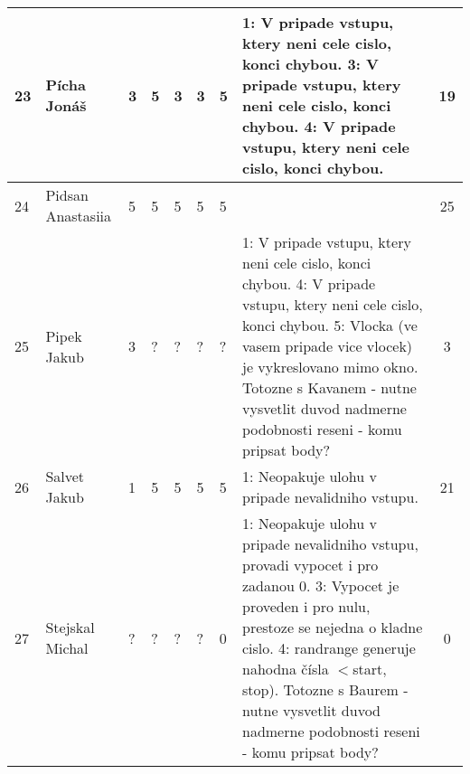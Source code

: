 \documentclass[landscape, 12pt]{article}
\begin{document}
\begin{longtable}{|l l | C{0.7cm} | C{0.7cm} | C{0.7cm} | C{0.7cm} | C{0.7cm} | L{15cm} |c|}
  23 & Pícha Jonáš        &       3 &       5 &       3 &       3 &       5 & 1: V pripade vstupu, ktery neni cele cislo, konci chybou. 3: V pripade vstupu, ktery neni cele cislo, konci chybou. 4: V pripade vstupu, ktery neni cele cislo, konci chybou.                                                                                                                                                                                                                             &       19 \\
\hline

  24 & Pidsan Anastasiia  &       5 &       5 &       5 &       5 &       5 &                                                                                                                                                                                                                                                                                                                                                                                      &       25 \\
\hline

  25 & Pipek Jakub        &       3 &       ? &       ? &       ? &       ? & 1: V pripade vstupu, ktery neni cele cislo, konci chybou. 4: V pripade vstupu, ktery neni cele cislo, konci chybou. 5: Vlocka (ve vasem pripade vice vlocek) je vykreslovano mimo okno.                                                                                                                Totozne s Kavanem - nutne vysvetlit duvod nadmerne podobnosti reseni - komu pripsat body?                                                                                                                   &       3 \\
\hline

  26 & Salvet Jakub       &       1 &       5 &       5 &       5 &       5 & 1: Neopakuje ulohu v pripade nevalidniho vstupu.                                                                                                                                                                                                                                                                                                                                        &       21 \\
\hline

  27 & Stejskal Michal    &       ? &       ? &       ? &       ? &       0 & 1: Neopakuje ulohu v pripade nevalidniho vstupu, provadi vypocet i pro zadanou 0. 3: Vypocet je proveden i pro nulu, prestoze se nejedna o kladne cislo. 4: randrange generuje nahodna čísla \ensuremath{<}start, stop). Totozne s Baurem - nutne vysvetlit duvod nadmerne podobnosti reseni - komu pripsat body?                                                                                                                                                                                  &       0 \\
\hline


\end{longtable}
\end{document}
